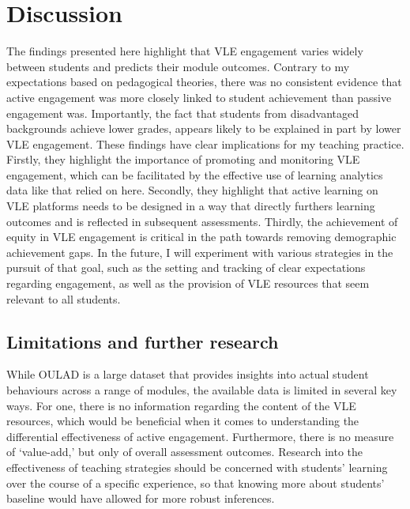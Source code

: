 \documentclass[
  english,
  man,mask,floatsintext]{apa6}
\begin{document}
\hypertarget{discussion}{%
\section{Discussion}\label{discussion}}

The findings presented here highlight that VLE engagement varies widely between students and predicts their module outcomes. Contrary to my expectations based on pedagogical theories, there was no consistent evidence that active engagement was more closely linked to student achievement than passive engagement was. Importantly, the fact that students from disadvantaged backgrounds achieve lower grades, appears likely to be explained in part by lower VLE engagement. These findings have clear implications for my teaching practice. Firstly, they highlight the importance of promoting and monitoring VLE engagement, which can be facilitated by the effective use of learning analytics data like that relied on here. Secondly, they highlight that active learning on VLE platforms needs to be designed in a way that directly furthers learning outcomes and is reflected in subsequent assessments. Thirdly, the achievement of equity in VLE engagement is critical in the path towards removing demographic achievement gaps. In the future, I will experiment with various strategies in the pursuit of that goal, such as the setting and tracking of clear expectations regarding engagement, as well as the provision of VLE resources that seem relevant to all students.

\hypertarget{limitations-and-further-research}{%
\subsection{Limitations and further research}\label{limitations-and-further-research}}

While OULAD is a large dataset that provides insights into actual student behaviours across a range of modules, the available data is limited in several key ways. For one, there is no information regarding the content of the VLE resources, which would be beneficial when it comes to understanding the differential effectiveness of active engagement. Furthermore, there is no measure of `value-add,' but only of overall assessment outcomes. Research into the effectiveness of teaching strategies should be concerned with students' learning over the course of a specific experience, so that knowing more about students' baseline would have allowed for more robust inferences.
\end{document}
